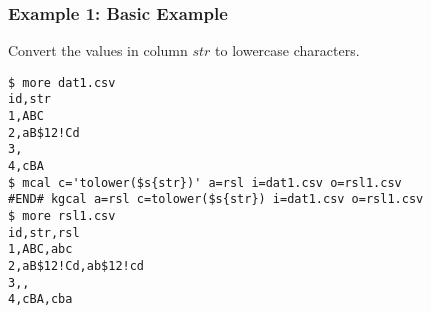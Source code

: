 \subsubsection*{Example 1: Basic Example}

Convert the values in column $str$ to lowercase characters.


\begin{Verbatim}[baselinestretch=0.7,frame=single]
$ more dat1.csv
id,str
1,ABC
2,aB$12!Cd
3,
4,cBA
$ mcal c='tolower($s{str})' a=rsl i=dat1.csv o=rsl1.csv
#END# kgcal a=rsl c=tolower($s{str}) i=dat1.csv o=rsl1.csv
$ more rsl1.csv
id,str,rsl
1,ABC,abc
2,aB$12!Cd,ab$12!cd
3,,
4,cBA,cba
\end{Verbatim}
